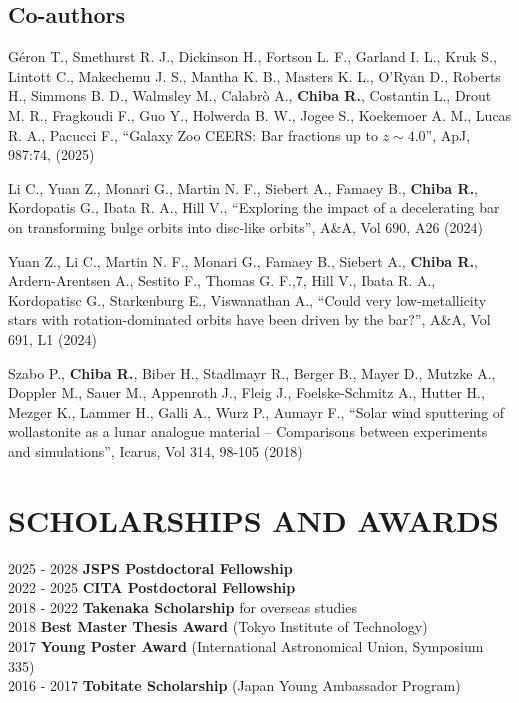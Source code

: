 \documentclass[]{res}
\begin{document}
\begin{resume}
\subsection{Co-authors}
\begin{etaremune}[leftmargin=6mm,rightmargin=-6mm]
    \item Géron T., Smethurst R. J., Dickinson H., Fortson L. F., Garland I. L., Kruk S., Lintott C., Makechemu J. S., Mantha K. B., Masters K. L., O'Ryan D., Roberts H., Simmons B. D., Walmsley M., Calabrò A., \textbf{Chiba R.}, Costantin L., Drout M. R., Fragkoudi F., Guo Y., Holwerda B. W., Jogee S., Koekemoer A. M., Lucas R. A., Pacucci F., ``Galaxy Zoo CEERS: Bar fractions up to $z\sim 4.0$'', ApJ, 987:74, (2025)
    \item Li C., Yuan Z., Monari G., Martin N. F., Siebert A., Famaey B., \textbf{Chiba R.}, Kordopatis G., Ibata R. A., Hill V., ``Exploring the impact of a decelerating bar on transforming bulge orbits into disc-like orbits'', A\&A, Vol 690, A26 (2024)
    \item Yuan Z., Li C., Martin N. F., Monari G., Famaey B., Siebert A., \textbf{Chiba R.}, Ardern-Arentsen A., Sestito F., Thomas G. F.,7, Hill V., Ibata R. A., Kordopatisc G., Starkenburg E., Viswanathan A., ``Could very low-metallicity stars with rotation-dominated orbits have been driven by the bar?'', A\&A, Vol 691, L1 (2024)
    \item Szabo P., \textbf{Chiba R.}, Biber H., Stadlmayr R., Berger B., Mayer D., Mutzke A., Doppler M., Sauer M., Appenroth J., Fleig J., Foelske-Schmitz A., Hutter H., Mezger K., Lammer H., Galli A., Wurz P., Aumayr F., ``Solar wind sputtering of wollastonite as a lunar analogue material -- Comparisons between experiments and simulations'', Icarus, Vol 314, 98-105 (2018)
\end{etaremune}

\section{SCHOLARSHIPS AND AWARDS}
\noindent
\begin{tabbing}
    2025 - 2028 \hspace{2mm} \=\textbf{JSPS Postdoctoral Fellowship}\\
    2022 - 2025 \hspace{2mm} \=\textbf{CITA Postdoctoral Fellowship}\\
    2018 - 2022 \hspace{2mm} \=\textbf{Takenaka Scholarship} for overseas studies\\
    2018        \hspace{2mm} \>\textbf{Best Master Thesis Award} (Tokyo Institute of Technology)\\
    2017        \hspace{2mm} \>\textbf{Young Poster Award} (International Astronomical Union, Symposium 335)\\
    2016 - 2017 \hspace{2mm} \>\textbf{Tobitate Scholarship} (Japan Young Ambassador Program)
\end{tabbing}


\end{resume}
\end{document}
